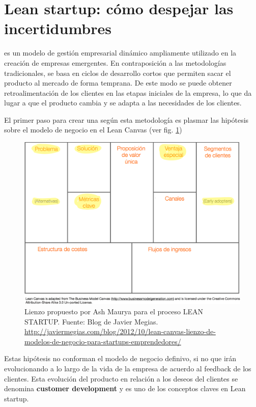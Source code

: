 \section{Lean startup: cómo despejar las incertidumbres}

 es un modelo de gestión empresarial dinámico ampliamente utilizado en la creación de empresas emergentes. En contraposición a las metodologías tradicionales,   se basa en ciclos de desarrollo cortos que permiten sacar el producto al mercado de forma temprana. De este modo se puede obtener retroalimentación de los clientes en las etapas iniciales de la empresa, lo que da lugar a que el producto cambia y se adapta a las necesidades de los clientes.

El primer paso para crear una  según esta metodología es plasmar las hipótesis sobre el modelo de negocio en el Lean Canvas (ver fig. \ref{leanCanvas})

\begin{figure}[H]
\begin{center}
\includegraphics[scale=0.25]{imagenes/lienzo_lean_canvas.png}
\caption{Lienzo propuesto por Ash Maurya para el proceso LEAN STARTUP. Fuente: Blog de Javier Megias. \url{http://javiermegias.com/blog/2012/10/lean-canvas-lienzo-de-modelos-de-negocio-para-startups-emprendedores/} }
\label{leanCanvas}
\end{center}
\end{figure}

Estas hipótesis no conforman el modelo de negocio definivo, si no que irán evolucionando a lo largo de la vida de la empresa de acuerdo al feedback de los clientes. Esta evolución del producto en relación a los deseos del clientes se denomina \textbf{customer development} y es uno de los conceptos claves en Lean startup.

